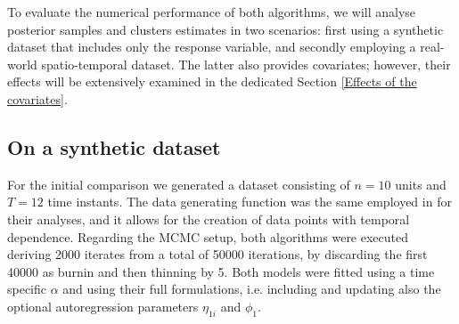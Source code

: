\documentclass[12pt,	%
	a4paper,		%
	twoside,		%
	openright,		%
	titlepage,%
	]{book}
\theoremstyle{definition}
\let\cite\citep
\begin{document}
To evaluate the numerical performance of both algorithms, we will analyse posterior samples and clusters estimates in two scenarios: first using a synthetic dataset that includes only the response variable, and secondly employing a real-world spatio-temporal dataset. The latter also provides covariates; however, their effects will be extensively examined in the dedicated Section \ref{Effects of the covariates}.\noclub


\subsection{On a synthetic dataset}
\label{Target variable only}

For the initial comparison we generated a dataset consisting of $n=10$ units and $T=12$ time instants. The data generating function was the same employed in \cite{1-drpm} for their analyses, and it allows for the creation of data points with temporal dependence. %
Regarding the MCMC setup, both algorithms were executed deriving 2000 iterates from a total of 50000 iterations, by discarding the first 40000 as burnin and then thinning by 5. Both models were fitted using a time specific $\alpha$ and using their full formulations, i.e. including and updating also the optional autoregression parameters $\eta_{1i}$ and $\phi_1$.
\end{document}
